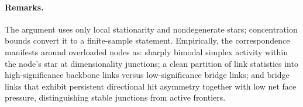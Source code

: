 \documentclass[11pt]{article}
\begin{document}
\paragraph{Remarks.} The argument uses only local stationarity and nondegenerate stars; concentration bounds convert it to a finite-sample statement. Empirically, the correspondence manifests around overloaded nodes as: sharply bimodal simplex activity within the node's star at dimensionality junctions; a clean partition of link statistics into high-significance backbone links versus low-significance bridge links; and bridge links that exhibit persistent directional hit asymmetry together with low net face pressure, distinguishing stable junctions from active frontiers.
\end{document}
